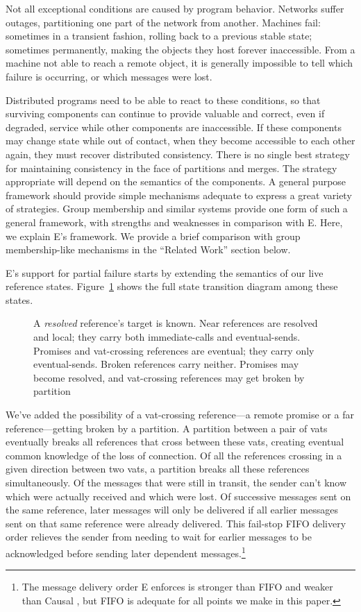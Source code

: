 \documentclass{llncs}
\begin{document}
Not all exceptional conditions are caused by program behavior.
Networks suffer outages, partitioning one part of the network from
another. Machines fail: sometimes in a transient fashion, rolling back
to a previous stable state; sometimes permanently, making the objects
they host forever inaccessible. From a machine not able to reach a
remote object, it is generally impossible to tell which failure is
occurring, or which messages were lost.

Distributed programs need to be able to react to these conditions, so
that surviving components can continue to provide valuable and
correct, even if degraded, service while other components are
inaccessible. If these components may change state while out of
contact, when they become accessible to each other again, they must
recover distributed consistency. There is no single best strategy for
maintaining consistency in the face of partitions and merges. The
strategy appropriate will depend on the semantics of the components. A
general purpose framework should provide simple mechanisms adequate to
express a great variety of strategies. Group membership and similar
systems provide one form of such a general framework, with strengths
and weaknesses in comparison with E. Here, we explain E's
framework. We provide a brief comparison with group membership-like
mechanisms in the ``Related Work'' section below.

E's support for partial failure starts by extending the semantics of
our live reference states. Figure~\ref{fig:refstates} shows the full
state transition diagram among these states.

\begin{figure}
\centerline{}
\caption{A \emph{resolved} reference's target is known. Near
  references are resolved and local; they carry both immediate-calls
  and eventual-sends. Promises and vat-crossing references are
  eventual; they carry only eventual-sends. Broken references carry
  neither. Promises may become resolved, and vat-crossing references
  may get broken by partition }
\label{fig:refstates}
\end{figure}

We've added the possibility of a vat-crossing reference---a remote
promise or a far reference---getting broken by a partition. A
partition between a pair of vats eventually breaks all references that
cross between these vats, creating eventual common knowledge of the
loss of connection. Of all the references crossing in a given
direction between two vats, a partition breaks all these references
simultaneously. Of the messages that were still in transit, the sender
can't know which were actually received and which were lost. Of
successive messages sent on the same reference, later messages will
only be delivered if all earlier messages sent on that same reference
were already delivered. This fail-stop FIFO delivery order relieves
the sender from needing to wait for earlier messages to be
acknowledged before sending later dependent messages.\footnote{
%
The message delivery order E enforces is stronger than FIFO and weaker
than Causal \cite{tribble:channels}, but FIFO is adequate for all
points we make in this paper.}
\end{document}
